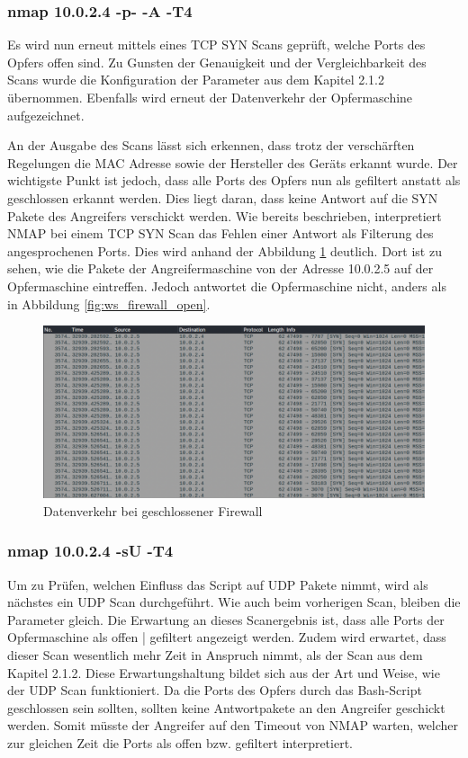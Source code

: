 \subsubsection{nmap 10.0.2.4 -p- -A -T4}
Es wird nun erneut mittels eines TCP SYN Scans geprüft, welche Ports des Opfers offen sind. Zu Gunsten der Genauigkeit und der Vergleichbarkeit des Scans wurde die Konfiguration der Parameter aus dem Kapitel 2.1.2 übernommen.
Ebenfalls wird erneut der Datenverkehr der Opfermaschine aufgezeichnet. 
\newpage


An der Ausgabe des Scans lässt sich erkennen, dass trotz der verschärften Regelungen die MAC Adresse sowie der Hersteller des Geräts erkannt wurde. 
Der wichtigste Punkt ist jedoch, dass alle Ports des Opfers nun als gefiltert anstatt als geschlossen erkannt werden. Dies liegt daran, dass keine Antwort auf die SYN Pakete des Angreifers verschickt werden. Wie bereits beschrieben, interpretiert NMAP bei einem TCP SYN Scan das Fehlen einer Antwort als Filterung des angesprochenen Ports. Dies wird anhand der Abbildung \ref{fig:ws_firewall_closed} deutlich. Dort ist zu sehen, wie die Pakete der Angreifermaschine von der Adresse 10.0.2.5 auf der Opfermaschine eintreffen. Jedoch antwortet die Opfermaschine nicht, anders als in Abbildung \ref{fig:ws_firewall_open}.

\begin{figure}
	\includegraphics[width=\linewidth]{img/ws_firewall_closed.png}
	\caption{Datenverkehr bei geschlossener Firewall}
	\label{fig:ws_firewall_closed}
\end{figure}

\subsubsection{nmap 10.0.2.4 -sU -T4}
Um zu Prüfen, welchen Einfluss das Script auf UDP Pakete nimmt, wird als nächstes ein UDP Scan durchgeführt. Wie auch beim vorherigen Scan, bleiben die Parameter gleich. Die Erwartung an dieses Scanergebnis ist, dass alle Ports der Opfermaschine als offen | gefiltert angezeigt werden. Zudem wird erwartet, dass dieser Scan wesentlich mehr Zeit in Anspruch nimmt, als der Scan aus dem Kapitel 2.1.2. Diese Erwartungshaltung bildet sich aus der Art und Weise, wie der UDP Scan funktioniert. Da die Ports des Opfers durch das Bash-Script geschlossen sein sollten, sollten keine Antwortpakete an den Angreifer geschickt werden. Somit müsste der Angreifer auf den Timeout von NMAP warten, welcher zur gleichen Zeit die Ports als offen bzw. gefiltert interpretiert.

